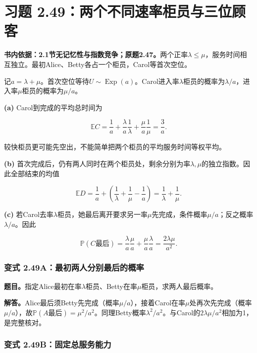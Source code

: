\documentclass[12pt,a4paper,UTF8,fontset=fandol]{ctexart}
\begin{document}
\section{习题
2.49：两个不同速率柜员与三位顾客}\label{ux4e60ux9898-2.49ux4e24ux4e2aux4e0dux540cux901fux7387ux67dcux5458ux4e0eux4e09ux4f4dux987eux5ba2}

\textbf{书内依据：2.1节无记忆性与指数竞争；原题2.47。}两个正率\(\lambda\le\mu\)，服务时间相互独立。最初Alice、Betty各占一个柜员，Carol等首次空位。

记\(a=\lambda+\mu\)。首次空位等待\(U\sim\operatorname{Exp}(a)\)。Carol进入率\(\lambda\)柜员的概率为\(\lambda/a\)，进入率\(\mu\)柜员的概率为\(\mu/a\)。

\textbf{(a)} Carol到完成的平均总时间为

\[\boxed{\mathbb EC=\frac1a+\frac\lambda a\frac1\lambda+
\frac\mu a\frac1\mu=\frac3a.}\]

较快柜员更可能先空出，不能简单把两个柜员的平均服务时间等权平均。

\textbf{(b)}
首次完成后，仍有两人同时在两个柜员处，剩余分别为率\(\lambda,\mu\)的独立指数。因此全部结束的均值

\[\boxed{\mathbb ED=\frac1a+\left(\frac1\lambda+\frac1\mu-\frac1a\right)
=\frac1\lambda+\frac1\mu.}\]

\textbf{(c)}
若Carol去率\(\lambda\)柜员，她最后离开要求另一率\(\mu\)先完成，条件概率\(\mu/a\)；反之概率\(\lambda/a\)。因此

\[\boxed{\mathbb P(C\text{最后})=\frac\lambda a\frac\mu a+\frac\mu a\frac\lambda a
=\frac{2\lambda\mu}{a^2}.}\]

\subsubsection{变式
2.49A：最初两人分别最后的概率}\label{ux53d8ux5f0f-2.49aux6700ux521dux4e24ux4ebaux5206ux522bux6700ux540eux7684ux6982ux7387}

\textbf{题目。}指定Alice最初在率\(\lambda\)柜员、Betty在率\(\mu\)柜员，求两人最后概率。

\textbf{解答。}Alice最后须Betty先完成（概率\(\mu/a\)），接着Carol在率\(\mu\)处再次先完成（概率\(\mu/a\)），故\(\mathbb P(A\text{最后})=\mu^2/a^2\)。同理Betty概率\(\lambda^2/a^2\)。与Carol的\(2\lambda\mu/a^2\)相加为1，是完整核对。

\subsubsection{变式
2.49B：固定总服务能力}\label{ux53d8ux5f0f-2.49bux56faux5b9aux603bux670dux52a1ux80fdux529b}
\end{document}
